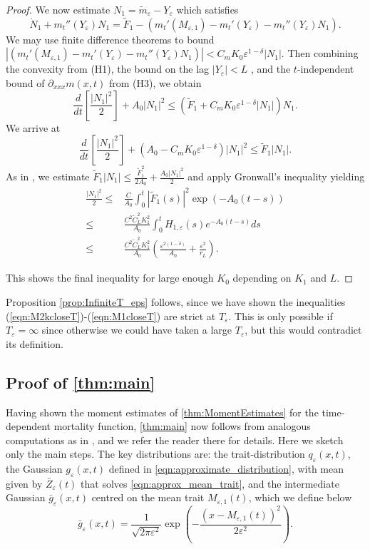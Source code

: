 \documentclass[]{article}
\theoremstyle{remark}
\begin{document}
\begin{proof}
We now estimate $N_1=\tilde{m}_\varepsilon-Y_\varepsilon$  which satisfies
\[\dot{N}_1+m_{t}''(Y_\varepsilon)N_1=\tilde{F}_1-(m_t'(M_{\varepsilon,1})-m_t'(Y_\varepsilon)-m_{t}''(Y_\varepsilon)N_1).\]
We may use finite difference theorems to bound $|(m_t'(M_{\varepsilon,1})-m_t'(Y_\varepsilon)-m_{t}''(Y_\varepsilon)N_1)|<C_mK_0\varepsilon^{1-\delta}|N_1|$. Then
combining the convexity from (H1), the bound on the lag $|Y_\varepsilon|<L$ , and the $t$-independent bound of $\partial_{xxx}m(x,t)$ from (H3), we obtain 
\[\frac{d}{dt}\left[\frac{|N_1|^2}{2}\right]+A_0|N_1|^2\leq{}(\tilde{F}_1+C_mK_0\varepsilon^{1-\delta}|N_1|)N_1.\]
We arrive at
\[\frac{d}{dt}\left[\frac{|N_1|^2}{2}\right]+(A_0-C_{m}K_0\varepsilon^{1-\delta})|N_1|^2\leq{}\tilde{F}_1|N_1|.\]
As in \cite{GHM}, we estimate $\tilde{F}_1|N_1|\leq{}\frac{\tilde{F}_1^2}{2A_0}+\frac{A_0|N_1|^2}{2}$ and apply Gronwall's inequality yielding
\begin{align*}
    \frac{|N_1|^2}{2}\leq{}&\frac{C}{A_0}\int_{0}^{t}|\tilde{F}_1(s)|^2\exp\left({-A_0(t-s)}\right)\\
    \leq{}&\frac{C^2\tilde{C}_L^2K_1^2}{A_0}\int_{0}^{t}H_{1,\varepsilon}(s){e^{-A_0(t-s)}}ds\\
    \leq{}&\frac{C^2\tilde{C}_L^2K_1^2}{A_0}\left(\frac{\varepsilon^{2(1-\delta)}}{A_0}+\frac{\varepsilon^2}{r_L}\right).
\end{align*}

This shows the final inequality for large enough $K_0$ depending on $K_1$ and $L$.
 \end{proof}

Proposition \ref{prop:InfiniteT_eps} follows, since we have shown the inequalities (\ref{eqn:M2kcloseT})-(\ref{eqn:M1closeT}) are strict at $T_\varepsilon$. This is only possible if $T_\varepsilon=\infty$ since otherwise we could have taken a large $T_\varepsilon$, but this would contradict its definition.

\subsection{Proof of \cref{thm:main}} Having shown the moment estimates of \cref{thm:MomentEstimates} for the time-dependent mortality function,
\cref{thm:main} now follows from analogous computations as in \cite{GHM}, and we refer the reader there for details. Here we sketch only the main steps. The key distributions are: the trait-distribution $q_\varepsilon(x,t)$, the  Gaussian $g_\varepsilon(x,t)$ defined in \eqref{eqn:approximate_distribution}, with mean given by  $\bar{Z}_\varepsilon(t)$ that solves \eqref{eqn:approx_mean_trait}, and the intermediate Gaussian $\bar{g}_\varepsilon(x,t)$ centred on the  mean trait ${M}_{\varepsilon,1}(t)$, which we define below
\begin{equation}\label{eqn:approximate_distribution2}
    \bar{g}_\varepsilon(x,t)=\frac{1}{\sqrt{2\pi\varepsilon^2}}\exp\left(-\frac{(x-{M}_{\varepsilon,1}(t))^2}{2\varepsilon^2}\right).
\end{equation}
\end{document}
